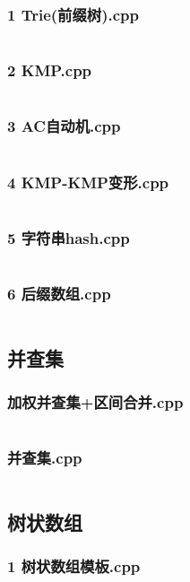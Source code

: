 \documentclass[a4paper,11pt]{article}
\begin{document}
\subsubsection{1 Trie(前缀树).cpp}
\inputminted[breaklines]{c++}{"D:/tmplz/templates/数据结构/字符串/1 Trie(前缀树).cpp"}
\subsubsection{2 KMP.cpp}
\inputminted[breaklines]{c++}{"D:/tmplz/templates/数据结构/字符串/2 KMP.cpp"}
\subsubsection{3 AC自动机.cpp}
\inputminted[breaklines]{c++}{"D:/tmplz/templates/数据结构/字符串/3 AC自动机.cpp"}
\subsubsection{4 KMP-KMP变形.cpp}
\inputminted[breaklines]{c++}{"D:/tmplz/templates/数据结构/字符串/4 KMP-KMP变形.cpp"}
\subsubsection{5 字符串hash.cpp}
\inputminted[breaklines]{c++}{"D:/tmplz/templates/数据结构/字符串/5 字符串hash.cpp"}
\subsubsection{6 后缀数组.cpp}
\inputminted[breaklines]{c++}{"D:/tmplz/templates/数据结构/字符串/6 后缀数组.cpp"}
\subsection{并查集}
\subsubsection{加权并查集+区间合并.cpp}
\inputminted[breaklines]{c++}{"D:/tmplz/templates/数据结构/并查集/加权并查集+区间合并.cpp"}
\subsubsection{并查集.cpp}
\inputminted[breaklines]{c++}{"D:/tmplz/templates/数据结构/并查集/并查集.cpp"}
\subsection{树状数组}
\subsubsection{1 树状数组模板.cpp}
\inputminted[breaklines]{c++}{"D:/tmplz/templates/数据结构/树状数组/1 树状数组模板.cpp"}
\end{document}
